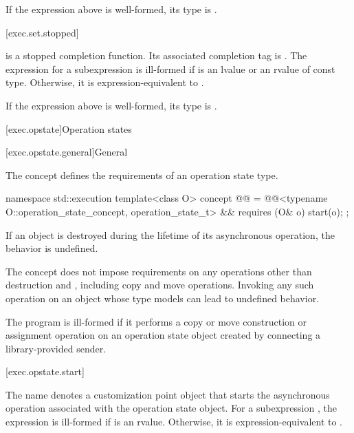 \mandates
If the expression above is well-formed, its type is .

[exec.set.stopped]{}

\pnum
{} is a stopped completion function.
Its associated completion tag is .
The expression 
for a subexpression  is ill-formed
if  is an lvalue or an rvalue of const type.
Otherwise, it is expression-equivalent to
.

\mandates
If the expression above is well-formed, its type is .

[exec.opstate]{Operation states}

[exec.opstate.general]{General}

\pnum
The  concept defines
the requirements of an operation state type.
\begin{codeblock}
namespace std::execution {
  template<class O>
    concept @@ =
      @@<typename O::operation_state_concept, operation_state_t> &&
      requires (O& o) {
        start(o);
      };
}
\end{codeblock}

\pnum
If an  object is destroyed
during the lifetime of its asynchronous operation,
the behavior is undefined.
\begin{note}
The  concept does not impose requirements
on any operations other than destruction and ,
including copy and move operations.
Invoking any such operation on an object
whose type models  can lead to undefined behavior.
\end{note}

\pnum
The program is ill-formed
if it performs a copy or move construction or assignment operation on
an operation state object created by connecting a library-provided sender.

[exec.opstate.start]{}

\pnum
The name  denotes a customization point object
that starts
the asynchronous operation associated with the operation state object.
For a subexpression ,
the expression  is ill-formed
if  is an rvalue.
Otherwise, it is expression-equivalent to
.

